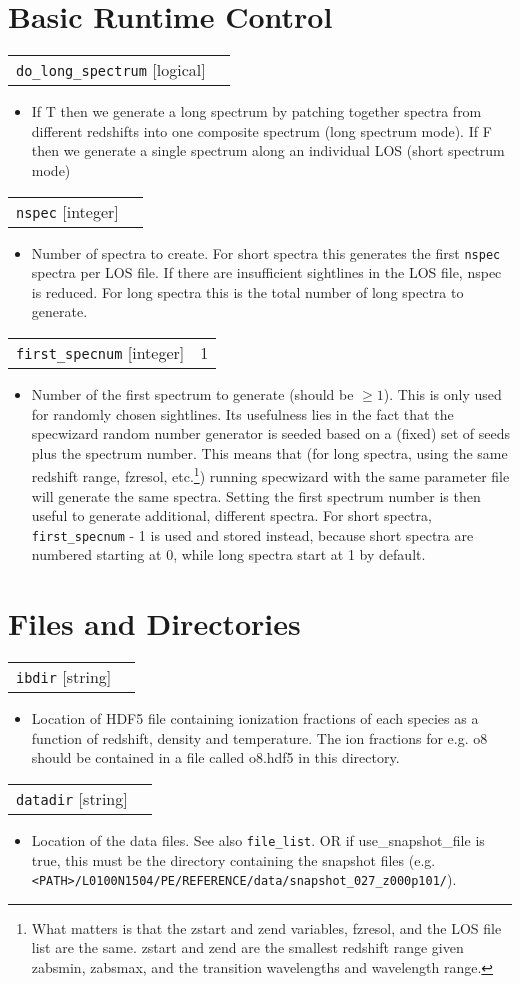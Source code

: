 \documentclass{report}
\makeatletter
\newcommand{\paramdefinition}[3]{
\begin{tabular*}{\textwidth}{l@{\extracolsep{\fill}}r}
		{\tt #1} [{\sc #2}]& #3 \\
\end{tabular*}}
\newcommand{\paramdescription}[1]{
\begin{itemize}
\item #1
\end{itemize}\vspace{0.2cm}}
\newcommand{\param}[1]{{\tt #1}}
\makeatother
\begin{document}
\section{Basic Runtime Control}

\paramdefinition{do\_long\_spectrum}{logical}{}
\paramdescription{If T then we generate a long spectrum by patching together spectra from different redshifts into one composite spectrum (long spectrum mode).  If F then we generate a single spectrum along an individual LOS (short spectrum mode)}

\paramdefinition{nspec}{integer}{}
\paramdescription{Number of spectra to create.  For short spectra this generates the first {\tt nspec} spectra per LOS file. If there are insufficient sightlines in the LOS file, nspec is reduced. For long spectra this is the total number of long spectra to generate.}

\paramdefinition{first\_specnum}{integer}{1}
\paramdescription{Number of the first spectrum to generate (should be $\geq 1$). This is only used for randomly chosen sightlines. Its usefulness lies in the fact that the specwizard random number generator is seeded based on a (fixed) set of seeds plus the spectrum number. This means that (for long spectra, using the same redshift range, fzresol, etc.\footnote{What matters is that the zstart and zend variables, fzresol, and the LOS file list are the same. zstart and zend are the smallest redshift range given zabsmin, zabsmax, and the transition wavelengths and wavelength range.}) running specwizard with the same parameter file will generate the same spectra. Setting the first spectrum number is then useful to generate additional, different spectra. For short spectra, \param{first\_specnum} - 1 is used and stored instead, because short spectra are numbered starting at 0, while long spectra start at 1 by default.}

\section{Files and Directories}

\paramdefinition{ibdir}{string}{}
\paramdescription{Location of HDF5 file containing ionization fractions of each species as a function of redshift, density and temperature. The ion fractions for e.g. o8 should be contained in a file called o8.hdf5 in this directory.}

\paramdefinition{datadir}{string}{}
\paramdescription{Location of the data files.  See also \param{file\_list}.
OR if use\_snapshot\_file is true, this must be the directory containing the snapshot files (e.g. \param{<PATH>/L0100N1504/PE/REFERENCE/data/snapshot\_027\_z000p101/}).}
\end{document}
